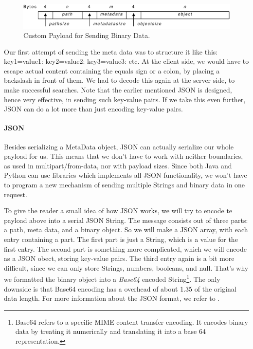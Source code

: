 \begin{figure}[ht] %
\begin{center}
\includegraphics[width=12cm]{custom_payload.pdf} 
\caption{Custom Payload for Sending Binary Data.\label{clientimpl-custom}}
\end{center}
\end{figure}

Our first attempt of sending the meta data was to structure it like this:
key1=value1: key2=value2: key3=value3: etc. At the client side, we would have to
escape actual content containing the equals sign or a colon, by placing a
backslash in front of them. We had to decode this again at the server side, to
make successful searches. Note that the earlier mentioned JSON is designed,
hence very effective, in sending such key-value pairs. If we take this even
further, JSON can do a lot more than just encoding key-value pairs.

\paragraph{JSON}
Besides serializing a MetaData object, JSON can actually serialize our whole
payload for us. This means that we don't have to work with neither boundaries,
as used in multipart/from-data, nor with payload sizes. Since both Java and
Python can use libraries which implements all JSON functionality, we won't
have to program a new mechanism of sending multiple Strings and binary data
in one request. 

To give the reader a small idea of how JSON works, we will try to encode te
payload above into a serial JSON String. The message consists out of three parts:
a path, meta data, and a binary object. So we will make a JSON array, with each
entry containing a part. The first part is just a String, which is a value for
the first entry. The second part is something more complicated, which we will
encode as a JSON obect, storing key-value pairs. The third entry again is a bit
more difficult, since we can only store Strings, numbers, booleans, and null.
That's why we formatted the binary object into a \emph{Base64} encoded
String\footnote{Base64 refers to a specific MIME content transfer encoding. It
encodes binary data by treating it numerically and translating it into a base 64
representation.}. The only downside is that Base64 encoding has a overhead of
about 1.35 of the original data length. For more information about the JSON
format, we refer to \cite{json-www}.


